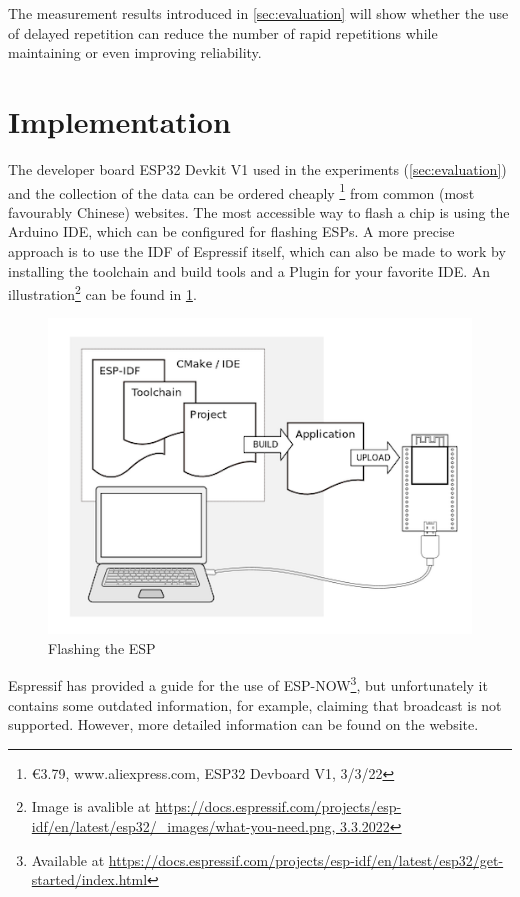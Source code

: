 The measurement results introduced in \cref{sec:evaluation} will show whether the use of delayed repetition 
can reduce the number of rapid repetitions while maintaining or even improving reliability.

\section{Implementation}

The developer board ESP32 Devkit V1 used in the experiments (\cref{sec:evaluation}) 
and the collection of the data can be ordered cheaply 
\footnote{€3.79, www.aliexpress.com, ESP32 Devboard V1, 3/3/22}
from common (most favourably Chinese) websites. 
The most accessible way to flash a chip is using the Arduino IDE, which can be configured for flashing ESPs.
A more precise approach is to use the IDF of Espressif itself, 
which can also be made to work by installing the toolchain and build tools and a Plugin for your favorite IDE.
An illustration\footnote{Image is avalible at \url{https://docs.espressif.com/projects/esp-idf/en/latest/esp32/_images/what-you-need.png, 3.3.2022}}
can be found in \cref{fig:ESP-IDF}.

\begin{figure}[h]
	\centering
	\includegraphics[scale=0.4]{figures/ESP-ISF.png}
	\caption{Flashing the ESP}
	\label{fig:ESP-IDF}
\end{figure}

Espressif has provided a guide for the use of ESP-NOW\footnote{Available at \url{https://docs.espressif.com/projects/esp-idf/en/latest/esp32/get-started/index.html}},
but unfortunately it contains some outdated information, 
for example, claiming that broadcast is not supported.
However, more detailed information can be found on the website.

